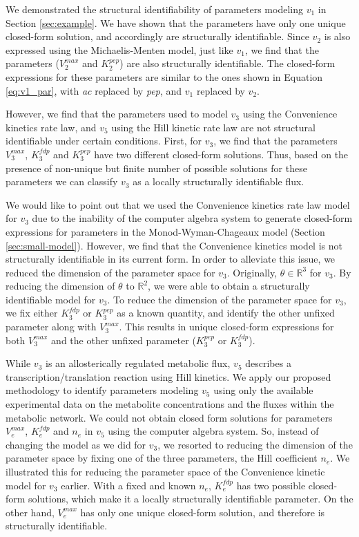 \documentclass[10pt]{article}
\begin{document}
	We demonstrated the structural identifiability of parameters modeling $v_1$ in Section \ref{sec:example}. We have shown that the parameters have only one unique closed-form solution, and accordingly are structurally identifiable. Since $v_2$ is also expressed using the Michaelis-Menten model, just like $v_1$, we find that the parameters ($V_2^{max}$ and $K_2^{pep}$) are also structurally identifiable. The closed-form expressions for these parameters are similar to the ones shown in Equation \ref{eq:v1_par}, with \textit{ac} replaced by \textit{pep}, and $v_1$ replaced by $v_2$. 
	
	However, we find that the parameters used to model $v_3$ using the Convenience kinetics rate law, and $v_5$ using the Hill kinetic rate law are not structural identifiable under certain conditions. First, for $v_3$, we find that the parameters $V_3^{max}$, $K_3^{fdp}$ and $K_3^{pep}$ have two different closed-form solutions. Thus, based on the presence of non-unique but finite number of possible solutions for these parameters we can classify $v_3$ as a locally structurally identifiable flux. 
	
	We would like to point out that we used the Convenience kinetics rate law model for $v_3$ due to the inability of the computer algebra system to generate closed-form expressions for parameters in the Monod-Wyman-Chageaux model (Section \ref{sec:small-model}). However, we find that the Convenience kinetics model is not structurally identifiable in its current form. In order to alleviate this issue, we reduced the dimension of the parameter space for $v_3$. Originally, $\theta \in \mathbb{R}^3$ for $v_3$. By reducing the dimension of $\theta$ to $\mathbb{R}^2$, we were able to obtain a structurally identifiable model for $v_3$. To reduce the dimension of the parameter space for $v_3$, we fix either $K_3^{fdp}$ or $K_3^{pep}$ as a known quantity, and identify the other unfixed parameter along with $V_3^{max}$. This results in unique closed-form expressions for both $V_3^{max}$ and the other unfixed parameter ($K_3^{pep}$ or $K_3^{fdp}$).
	
	While $v_3$ is an allosterically regulated metabolic flux, $v_5$ describes a transcription/translation reaction using Hill kinetics. We apply our proposed methodology to identify parameters modeling $v_5$ using only the available experimental data on the metabolite concentrations and the fluxes within the metabolic network. We could not obtain closed form solutions for parameters $V_e^{max}$, $K_e^{fdp}$ and $n_e$ in $v_5$ using the computer algebra system. So, instead of changing the model as we did for $v_3$, we resorted to reducing the dimension of the parameter space by fixing one of the three parameters, the Hill coefficient $n_e$. We illustrated this for reducing the parameter space of the Convenience kinetic model for $v_3$ earlier. With a fixed and known $n_e$, $K_e^{fdp}$ has two possible closed-form solutions, which make it a locally structurally identifiable parameter. On the other hand, $V_e^{max}$ has only one unique closed-form solution, and therefore is structurally identifiable. 
	
\end{document}
